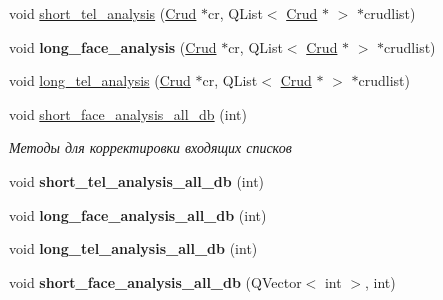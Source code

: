 \begin{DoxyCompactItemize}
void \mbox{\hyperlink{class_for__analysis_ae9aabdb8bb40a43b96e046cb2781fd72}{short\+\_\+tel\+\_\+analysis}} (\mbox{\hyperlink{class_crud}{Crud}} $\ast$cr, Q\+List$<$ \mbox{\hyperlink{class_crud}{Crud}} $\ast$ $>$ $\ast$crudlist)
\item 
\mbox{\label{class_for__analysis_a831f4f0e4b72d5ffa824389d9ca8d407}} 
void {\bfseries long\+\_\+face\+\_\+analysis} (\mbox{\hyperlink{class_crud}{Crud}} $\ast$cr, Q\+List$<$ \mbox{\hyperlink{class_crud}{Crud}} $\ast$ $>$ $\ast$crudlist)
\item 
void \mbox{\hyperlink{class_for__analysis_a99f0ecf9d9f7d239d042953776f2be18}{long\+\_\+tel\+\_\+analysis}} (\mbox{\hyperlink{class_crud}{Crud}} $\ast$cr, Q\+List$<$ \mbox{\hyperlink{class_crud}{Crud}} $\ast$ $>$ $\ast$crudlist)
\item 
\mbox{\label{class_for__analysis_a9baafc699e78e96c223b1795298e619b}} 
void \mbox{\hyperlink{class_for__analysis_a9baafc699e78e96c223b1795298e619b}{short\+\_\+face\+\_\+analysis\+\_\+all\+\_\+db}} (int)
\begin{DoxyCompactList}\small\item\em Методы для корректировки входящих списков \end{DoxyCompactList}\item 
\mbox{\label{class_for__analysis_a3d30fdd275d64534d8107b64da12d06b}} 
void {\bfseries short\+\_\+tel\+\_\+analysis\+\_\+all\+\_\+db} (int)
\item 
\mbox{\label{class_for__analysis_a1f3042ab6d2991ff52de1c74eeb91487}} 
void {\bfseries long\+\_\+face\+\_\+analysis\+\_\+all\+\_\+db} (int)
\item 
\mbox{\label{class_for__analysis_a6523286da4464149de9f8a8e42fb384f}} 
void {\bfseries long\+\_\+tel\+\_\+analysis\+\_\+all\+\_\+db} (int)
\item 
\mbox{\label{class_for__analysis_ab1bb09786abe35d042ea4c157cedf69f}} 
void {\bfseries short\+\_\+face\+\_\+analysis\+\_\+all\+\_\+db} (Q\+Vector$<$ int $>$, int)
\item 
\mbox{\label{class_for__analysis_a7c7b28b087523e4692af81b712ff7bb2}} 

\end{DoxyCompactItemize}
